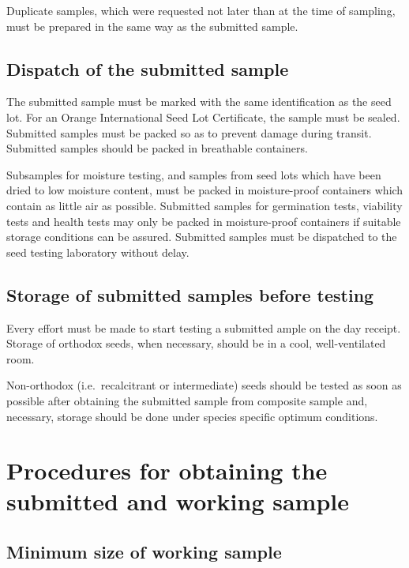 \documentclass[]{book}
\begin{document}
Duplicate samples, which were requested not later than at the time of
sampling, must be prepared in the same way as the submitted sample.

\subsection{Dispatch of the submitted
sample}\label{dispatch-of-the-submitted-sample}

The submitted sample must be marked with the same identification as the
seed lot. For an Orange International Seed Lot Certificate, the sample
must be sealed. Submitted samples must be packed so as to prevent damage
during transit. Submitted samples should be packed in breathable
containers.

Subsamples for moisture testing, and samples from seed lots which have
been dried to low moisture content, must be packed in moisture-proof
containers which contain as little air as possible. Submitted samples
for germination tests, viability tests and health tests may only be
packed in moisture-proof containers if suitable storage conditions can
be assured. Submitted samples must be dispatched to the seed testing
laboratory without delay.

\subsection{Storage of submitted samples before
testing}\label{storage-of-submitted-samples-before-testing}

Every effort must be made to start testing a submitted ample on the day
receipt. Storage of orthodox seeds, when necessary, should be in a cool,
well-ventilated room.

Non-orthodox (i.e.~recalcitrant or intermediate) seeds should be tested
as soon as possible after obtaining the submitted sample from composite
sample and, necessary, storage should be done under species specific
optimum conditions.

\section{Procedures for obtaining the submitted and working
sample}\label{procedures-for-obtaining-the-submitted-and-working-sample}

\subsection{Minimum size of working
sample}\label{minimum-size-of-working-sample}
\end{document}

